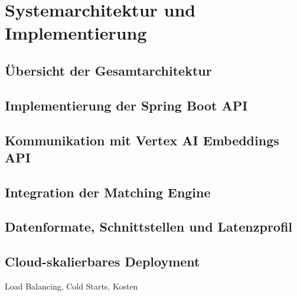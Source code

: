 \section{Systemarchitektur und Implementierung}

\subsection{Übersicht der Gesamtarchitektur}

\subsection{Implementierung der Spring Boot API}

\subsection{Kommunikation mit Vertex AI Embeddings API}

\subsection{Integration der Matching Engine}

\subsection{Datenformate, Schnittstellen und Latenzprofil}

\subsection{Cloud-skalierbares Deployment}
Load Balancing, Cold Starts, Kosten